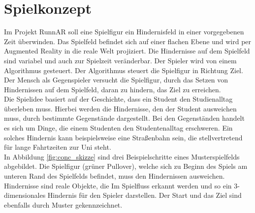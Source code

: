 \section{Spielkonzept}
Im Projekt RunnAR soll eine Spielfigur ein Hindernisfeld in einer vorgegebenen Zeit überwinden. Das Spielfeld befindet sich auf einer flachen Ebene und wird per Augmented Reality in die reale Welt projiziert. Die Hindernisse auf dem Spielfeld sind variabel und auch zur Spielzeit veränderbar. Der Spieler wird von einem Algorithmus gesteuert. Der Algorithmus steuert die Spielfigur in Richtung Ziel. Der Mensch als Gegenspieler versucht die Spielfigur, durch das Setzen von Hindernissen auf dem Spielfeld, daran zu hindern, das Ziel zu erreichen.\\
Die Spielidee basiert auf der Geschichte, dass ein Student den Studienalltag überleben muss. Hierbei werden die Hindernisse, den der Student ausweichen muss, durch bestimmte Gegenstände dargestellt. Bei den Gegenständen handelt es sich um Dinge, die einem Studenten den Studentenalltag erschweren. Ein solches Hindernis kann beispielsweise eine Straßenbahn sein, die stellvertretend für lange Fahrtzeiten zur Uni steht.\\
In Abbildung \ref{fig:conc_skizze} sind drei Beispielschritte eines Musterspielfelds abgebildet. Die Spielfigur (grüner Pullover), welche sich zu Beginn des Spiels am unteren Rand des Spielfelds befindet, muss den Hindernissen ausweichen. Hindernisse sind reale Objekte, die Im Spielfluss erkannt werden und so ein 3-dimensionales Hindernis für den Spieler darstellen. Der Start und das Ziel sind ebenfalls durch Muster gekennzeichnet. 

